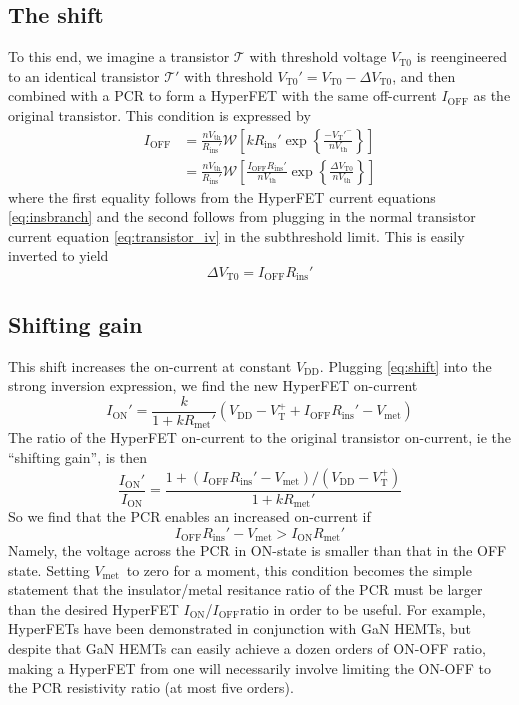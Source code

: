 \documentclass[letterpaper]{article}
\newcommand{\VTO}{\ensuremath{V_\mathrm{T0}}}
\newcommand{\VTp}{\ensuremath{V_\mathrm{T}^+}}
\newcommand{\Vth}{\ensuremath{V_\mathrm{th}}}
\newcommand{\Vmet}{\ensuremath{V_\mathrm{met}}}
\newcommand{\IOFF }{\ensuremath{I_\mathrm{OFF}}}
\newcommand{\ION}{\ensuremath{I_\mathrm{ON}}}
\newcommand{\Rinsp}{\ensuremath{R_\mathrm{ins}'}}
\newcommand{\Rmetp}{\ensuremath{R_\mathrm{met}'}}
\begin{document}
\subsection{The shift}
To this end, we imagine a transistor $\mathcal{T}$ with threshold voltage $\VTO$ is reengineered to an identical transistor $\mathcal{T'}$ with threshold $\VTO'=\VTO-\Delta \VTO$, and then combined with a PCR to form a HyperFET with the same off-current $\IOFF $ as the original transistor.  This condition is expressed by
\begin{align}
  \IOFF &=\frac{n V_\mathrm{th}}{\Rinsp}\mathcal{W}\left[ k\Rinsp\exp\left\{ \frac{-V_\mathrm{T}'^{-}}{n\Vth} \right\} \right]\\
  &=\frac{n V_\mathrm{th}}{\Rinsp}\mathcal{W}\left[ \frac{\IOFF \Rinsp}{n\Vth}\exp\left\{ \frac{\Delta \VTO}{n\Vth} \right\} \right]
  \label{}
\end{align}
where the first equality follows from the HyperFET current equations \eqref{eq:insbranch} and the second follows from plugging in the normal transistor current equation \eqref{eq:transistor_iv} in the subthreshold limit.  This is easily inverted to yield
\begin{equation}
  \Delta \VTO=\IOFF \Rinsp 
  \label{eq:shift}
\end{equation}
\subsection{Shifting gain}
This shift increases the on-current at constant $V_\mathrm{DD}$.  Plugging \eqref{eq:shift} into the strong inversion expression, we find the new HyperFET on-current 
\begin{equation}
  \ION'=\frac{k}{1+k\Rmetp }\left( V_\mathrm{DD}-\VTp+\IOFF \Rinsp -V_\mathrm{met} \right)
  \label{eq:shiftedon}
\end{equation}
The ratio of the HyperFET on-current to the original transistor on-current, ie the ``shifting gain'', is then
\begin{equation}
  \frac{\ION'}{\ION}=\frac{1+\left( \IOFF \Rinsp -V_\mathrm{met}\right)/(V_\mathrm{DD}-\VTp )}{1+k\Rmetp }
  \label{eq:Ion_rat}
\end{equation}
So we find that the PCR enables an increased on-current if
\begin{equation}
  \IOFF \Rinsp -V_\mathrm{met} >\ION\Rmetp
  \label{eq:inconcond}
\end{equation}
Namely, the voltage across the PCR in ON-state is smaller than that in the OFF state.  Setting \Vmet\ to zero for a moment, this condition becomes the simple statement that the insulator/metal resitance ratio of the PCR must be larger than the desired HyperFET \ION/\IOFF ratio in order to be useful.  For example, HyperFETs have been demonstrated in conjunction with GaN HEMTs, but despite that GaN HEMTs can easily achieve a dozen orders of ON-OFF ratio, making a HyperFET from one will necessarily involve limiting the ON-OFF to the PCR resistivity ratio (at most five orders).
\end{document}
